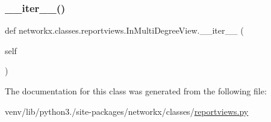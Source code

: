 \mbox{\label{classnetworkx_1_1classes_1_1reportviews_1_1InMultiDegreeView_a887bf851350a7d15ae6424f439abc36b}} 
\subsubsection{\texorpdfstring{\+\_\+\+\_\+iter\+\_\+\+\_\+()}{\_\_iter\_\_()}}
{\footnotesize\ttfamily def networkx.\+classes.\+reportviews.\+In\+Multi\+Degree\+View.\+\_\+\+\_\+iter\+\_\+\+\_\+ (\begin{DoxyParamCaption}\item[{}]{self }\end{DoxyParamCaption})}



The documentation for this class was generated from the following file\+:\begin{DoxyCompactItemize}
\item 
venv/lib/python3./site-\/packages/networkx/classes/\hyperlink{reportviews_8py}{reportviews.\+py}\end{DoxyCompactItemize}
